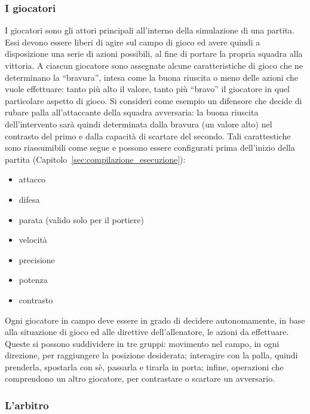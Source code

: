 \subsubsection{I giocatori}
\label{sec:analisi_giocatori}

I giocatori sono gli attori principali all'interno della simulazione di una partita. Essi devono essere liberi di agire sul campo di gioco ed avere quindi a disposizione una serie di azioni possibili, al fine di portare la propria squadra alla vittoria. A ciascun giocatore sono assegnate alcune caratteristiche di gioco che ne determinano la ``bravura'', intesa come la buona riuscita o meno delle azioni che vuole effettuare: tanto più alto il valore, tanto più ``bravo'' il giocatore in quel particolare aspetto di gioco. Si consideri come esempio un difensore che decide di rubare palla all'attaccante della squadra avversaria: la buona riuscita dell'intervento sarà quindi determinata dalla bravura (un valore alto) nel contrasto del primo e dalla capacità di scartare del secondo. Tali carattestiche sono riassumibili come segue e possono essere configurati prima dell'inizio della partita (Capitolo~\ref{sec:compilazione_esecuzione}):

\begin{itemize}
	\item attacco
	\item difesa
	\item parata (valido solo per il portiere)
	\item velocità
	\item precisione
	\item potenza
	\item contrasto
\end{itemize}

Ogni giocatore in campo deve essere in grado di decidere autonomamente, in base alla situazione di gioco ed alle direttive dell'allenatore, le azioni da effettuare. Queste  si possono suddividere in tre gruppi: movimento nel campo, in ogni direzione, per raggiungere la posizione desiderata; interagire con la palla, quindi prenderla, spostarla con sè, passarla e tirarla in porta; infine, operazioni che comprendono un altro giocatore, per contrastare o scartare un avversario.\\

\subsubsection{L'arbitro}
\label{sec:analisi_arbitro}

